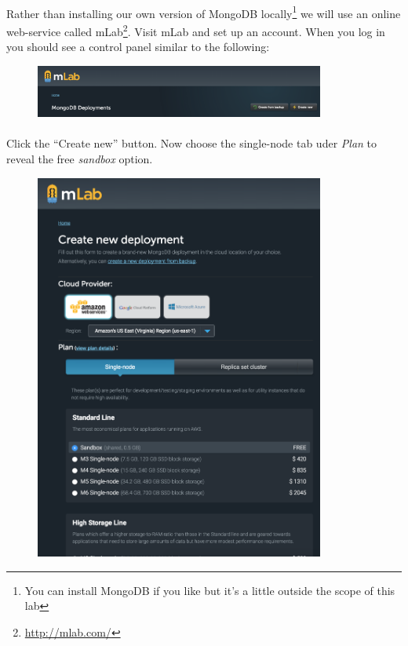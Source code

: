 \documentclass[10pt, a4paper, twosize]{article}
\begin{document}
\paragraph{} Rather than installing our own version of MongoDB locally\footnote{You can install MongoDB if you like but it's a little outside the scope of this lab} we will use an online web-service called mLab\footnote{\url{http://mlab.com/}}. Visit mLab and set up an account. When you log in you should see a control panel similar to the following:

\begin{figure}[H]
\centering
\includegraphics[width=0.85\textwidth]{images/mlab_controlpanel}
\caption{}
\label{fig:}
\end{figure}

\paragraph{} Click the ``Create new'' button. Now choose the single-node tab uder \emph{Plan} to reveal the free \emph{sandbox} option.

\begin{figure}[H]
\centering
\includegraphics[width=0.85\textwidth]{images/mlab_newdeployment}
\caption{}
\label{fig:}
\end{figure}
\end{document}
